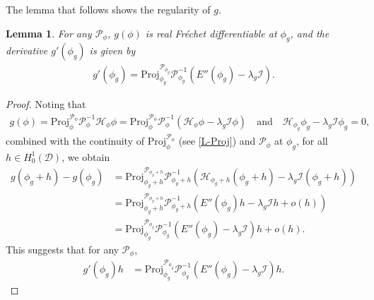 \documentclass[preprint,3p]{elsarticle}
\newtheorem{lemma}{Lemma}[section]
\begin{document}
The lemma that follows shows the regularity of \(g\). 
\begin{lemma}\label{F-diff}
	For any \(\mathcal{P}_{\phi}\), \(g(\phi)\) is real Fr\'echet differentiable at \(\phi_g\), and the derivative \(g'(\phi_g)\) is given by
	{\rm\begin{align*}
			g'(\phi_g) = \text{Proj}^{ \mathcal{P}_{\phi_g}}_{\phi_g} \mathcal{P}^{-1}_{\phi_g} \left(E''(\phi_g) - \lambda_g \mathcal{I}\right).
	\end{align*}}
\end{lemma}
\begin{proof}
	Noting that 
	\begin{align*}
		g(\phi)= \text{Proj}^{\mathcal{P}_{\phi}}_{\phi}\mathcal{P}_{\phi}^{-1}\mathcal{H}_{\phi}\phi=\text{Proj}^{\mathcal{P}_{\phi}}_{\phi}\mathcal{P}_{\phi}^{-1}\left(\mathcal{H}_{\phi}\phi-\lambda_g\mathcal{I}\phi\right)\quad\text{and}\quad \mathcal{H}_{\phi_g}\phi_g-\lambda_g\mathcal{I}\phi_g=0,
	\end{align*}
	combined with the continuity of $\text{Proj}^{\mathcal{P}_{\phi}}_{\phi}$ (see \eqref{L-Proj}) and $\mathcal{P}_{\phi}$ at $\phi_g$, for all $h\in H_0^1(\mathcal{D})$, we obtain
	\begin{align*}
		g(\phi_g+h)-g(\phi_g)&=\text{Proj}^{\mathcal{P}_{\phi_g+h}}_{\phi_g+h}\mathcal{P}_{\phi_g+h}^{-1}\left(\mathcal{H}_{\phi_g+h}(\phi_g+h)-\lambda_g\mathcal{I}(\phi_g+h)\right)\\
		&=\text{Proj}^{\mathcal{P}_{\phi_g+h}}_{\phi_g+h}\mathcal{P}_{\phi_g+h}^{-1}\left(E''(\phi_g)h-\lambda_g\mathcal{I}h+o\left(h\right)\right)\\
		&=\text{Proj}^{\mathcal{P}_{\phi_g}}_{\phi_g}\mathcal{P}_{\phi_g}^{-1}\left(E''(\phi_g)-\lambda_g\mathcal{I}\right)h+o\left(h\right).
	\end{align*}
	This suggests that for any $\mathcal{P}_{\phi}$,
	\begin{align*}
		g'(\phi_g)h&= \text{Proj}^{\mathcal{P}_{\phi_g}}_{\phi_g}\mathcal{P}^{-1}_{\phi_g}\left(E''(\phi_g)-\lambda_g\mathcal{I}\right)h.
	\end{align*}
\end{proof}
\end{document}
